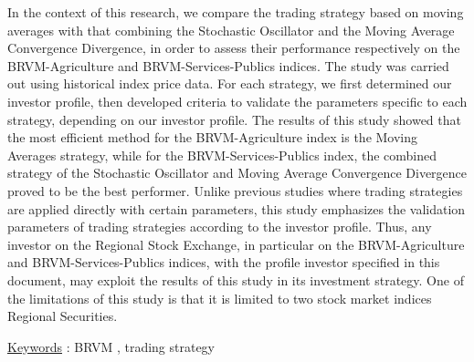     In the context of this research, we compare the trading strategy
    based on moving averages with that combining the Stochastic Oscillator
    and the Moving Average Convergence Divergence, in order to assess their performance
     respectively on the BRVM-Agriculture and BRVM-Services-Publics indices.
     The study was carried out using historical index price data.
    For each strategy, we first determined our investor profile,
    then developed criteria to validate the parameters specific to
    each strategy, depending on our investor profile.
    The results of this study showed that the most efficient method for
    the BRVM-Agriculture index is the Moving Averages strategy, while for
    the BRVM-Services-Publics index, the combined strategy of the Stochastic Oscillator
    and Moving Average Convergence Divergence proved to be the best performer.
    Unlike previous studies where trading strategies are applied
    directly with certain parameters, this study emphasizes the validation
    parameters of trading strategies according to the investor profile.
    Thus, any investor on the Regional Stock Exchange, in particular
    on the BRVM-Agriculture and BRVM-Services-Publics indices, with the profile
    investor specified in this document, may exploit the results of this
    study in its investment strategy.
    One of the limitations of this study is that it is limited to two stock market indices
    Regional Securities.


\underline{Keywords} : BRVM , trading strategy




